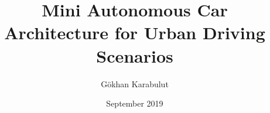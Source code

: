 \documentclass[chaparabic,ceng,ms,12pt,oneandhalf]{metu}
\author{Gökhan Karabulut}
\title{Mini Autonomous Car Architecture for Urban Driving Scenarios}
\date{September 2019}
\numberwithin{equation}{chapter}
\begin{document}
\begin{preliminaries}


\end{preliminaries}
%
%
%

\setlength{\parindent}{0em}
\setlength{\parskip}{10pt}












%
%

% 

% 
\end{document}
